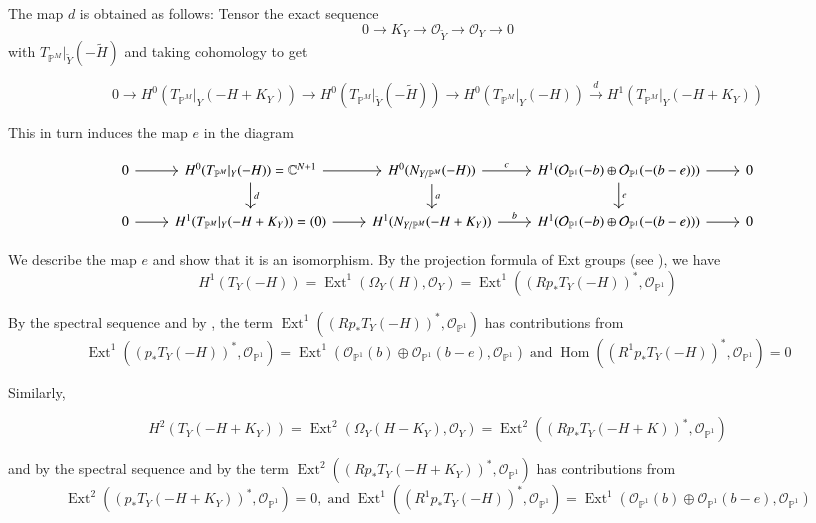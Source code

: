 \documentclass[11pt,twoside]{amsart}
\theoremstyle{plain}
\numberwithin{equation}{section}
\theoremstyle{definition}
\begin{document}
The map $d$ is obtained as follows:
Tensor the exact sequence 
$$0 \to K_Y \to \mathcal{O}_{\widetilde{Y}} \to \mathcal{O}_Y \to 0$$ with $T_{\mathbb{P}^M}|_{\widetilde{Y}}(-\widetilde{H})$ and taking cohomology to get 

$$0 \to H^0(T_{\mathbb{P}^M}|_Y (-H+K_Y)) \to H^0(T_{\mathbb{P}^M}|_{\widetilde{Y}}(-\widetilde{H})) \to H^0(T_{\mathbb{P}^M}|_Y (-H)) \xrightarrow[]{d} H^1(T_{\mathbb{P}^M}|_Y (-H+K_Y))  $$

This in turn induces the map $e$ in the diagram 

\[
\begin{tikzcd}\label{70}
  0 \arrow[r] & H^0(T_{\mathbb{P}^M}|_Y (-H)) = \mathbb{C}^{N+1} \arrow[r] \arrow[d, "d"]  & H^0(N_{Y/\mathbb{P}^M}(-H)) \arrow[r, "c"] \arrow[d, "a"] & H^1(\mathcal{O}_{\mathbb{P}^1}(-b) \oplus \mathcal{O}_{\mathbb{P}^1}(-(b-e))) \arrow[r] \arrow[d, "e"] & 0 \\
  0 \arrow[r] & H^1(T_{\mathbb{P}^M}|_Y (-H+K_Y)) = (0) \arrow[r]  & H^1(N_{Y/\mathbb{P}^M}(-H+K_Y)) \arrow[r, "b"]  & H^1(\mathcal{O}_{\mathbb{P}^1}(-b) \oplus \mathcal{O}_{\mathbb{P}^1}(-(b-e))) \arrow[r] & 0
\end{tikzcd}
\]

\color{blue}
We describe the map $e$ and show that it is an isomorphism. By the projection formula of Ext groups (see \cite[\href{https://stacks.math.columbia.edu/tag/08JM}{Tag 08JM}]{stacks-project}), we have 
$$H^1(T_Y(-H)) = \operatorname{Ext}^1(\Omega_Y(H),\mathcal{O}_Y) = \operatorname{Ext}^1((Rp_*T_Y(-H))^*,\mathcal{O}_{\mathbb{P}^1})$$

By the spectral sequence and by , the term $\operatorname{Ext}^1((Rp_*T_Y(-H))^*,\mathcal{O}_{\mathbb{P}^1})$ has contributions from 
$$\operatorname{Ext}^1((p_*T_Y(-H))^*,\mathcal{O}_{\mathbb{P}^1}) =  \operatorname{Ext}^1(\mathcal{O}_{\mathbb{P}^1}(b) \oplus \mathcal{O}_{\mathbb{P}^1}(b-e) ,\mathcal{O}_{\mathbb{P}^1}) \operatorname{and} \operatorname{Hom}((R^1p_*T_Y(-H))^*,\mathcal{O}_{\mathbb{P}^1}) = 0$$

Similarly, 

$$H^2(T_Y(-H+K_Y)) = \operatorname{Ext}^2(\Omega_Y(H-K_Y),\mathcal{O}_Y) = \operatorname{Ext}^2((Rp_*T_Y(-H+K))^*,\mathcal{O}_{\mathbb{P}^1})$$

and by the spectral sequence and by  the term $\operatorname{Ext}^2((Rp_*T_Y(-H+K_Y))^*,\mathcal{O}_{\mathbb{P}^1})$ has contributions from 
$$\operatorname{Ext}^2((p_*T_Y(-H+K_Y))^*,\mathcal{O}_{\mathbb{P}^1}) = 0, \operatorname{and} \operatorname{Ext}^1((R^1p_*T_Y(-H))^*, \mathcal{O}_{\mathbb{P}^1}) = \operatorname{Ext}^1(\mathcal{O}_{\mathbb{P}^1}(b) \oplus \mathcal{O}_{\mathbb{P}^1}(b-e) ,\mathcal{O}_{\mathbb{P}^1})$$
\end{document}
